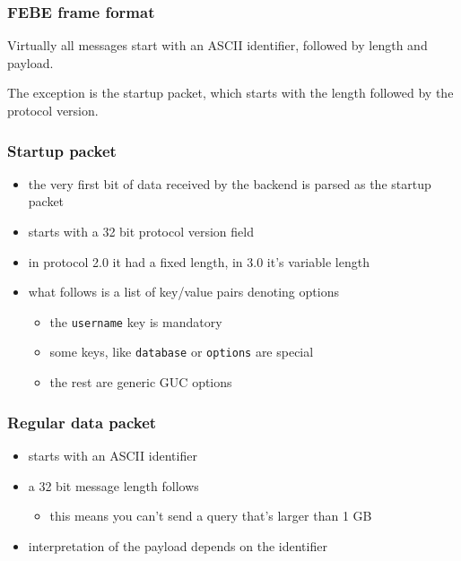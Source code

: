 \documentclass{beamer}
\begin{document}
\begin{frame}
  \frametitle{FEBE frame format}

  Virtually all messages start with an ASCII identifier, followed by length and
  payload.


  The exception is the startup packet, which starts with the length followed by
  the protocol version.


\end{frame}

\begin{frame}
  \frametitle{Startup packet}


  \begin{itemize}
  \item the very first bit of data received by the backend is parsed as the
    startup packet
  \item starts with a 32 bit protocol version field
  \item in protocol 2.0 it had a fixed length, in 3.0 it's variable length
  \item what follows is a list of key/value pairs denoting options
    \begin{itemize}
    \item the \texttt{username} key is mandatory
    \item some keys, like \texttt{database} or \texttt{options} are special
    \item the rest are generic GUC options
    \end{itemize}
  \end{itemize}
\end{frame}

\begin{frame}
  \frametitle{Regular data packet}


  \begin{itemize}
  \item starts with an ASCII identifier
  \item a 32 bit message length follows
    \begin{itemize}
    \item this means you can't send a query that's larger than 1 GB
    \end{itemize}
  \item interpretation of the payload depends on the identifier
  \end{itemize}
\end{frame}
\end{document}
